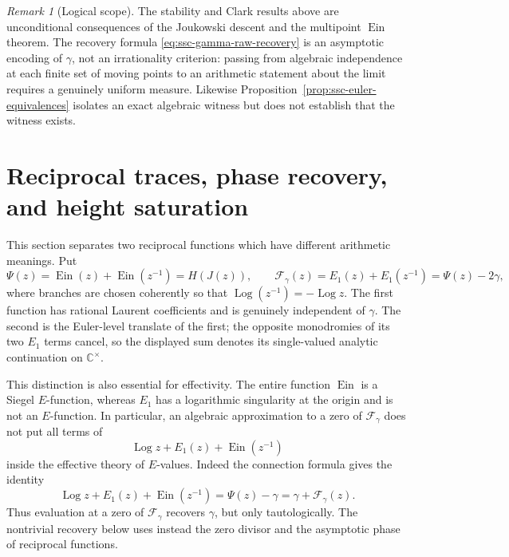 \documentclass[11pt]{article}
\theoremstyle{definition}
\theoremstyle{remark}
\newtheorem{remark}[theorem]{Remark}
\newcommand{\C}{\mathbb C}
\newcommand{\Ein}{\operatorname{Ein}}
\newcommand{\Log}{\operatorname{Log}}
\begin{document}
\begin{remark}[Logical scope]
The stability and Clark results above are unconditional consequences of
the Joukowski descent and the multipoint \(\Ein\) theorem.  The recovery
formula \eqref{eq:ssc-gamma-raw-recovery} is an asymptotic encoding of
\(\gamma\), not an irrationality criterion: passing from algebraic
independence at each finite set of moving points to an arithmetic statement
about the limit requires a genuinely uniform measure.  Likewise
Proposition~\ref{prop:ssc-euler-equivalences} isolates an exact algebraic
witness but does not establish that the witness exists.
\end{remark}

\section{Reciprocal traces, phase recovery, and height saturation}
\label{sec:reciprocal-trace-height}

This section separates two reciprocal functions which have different
arithmetic meanings.  Put
\begin{equation}\label{eq:Psi-and-Fgamma}
 \Psi(z)=\Ein(z)+\Ein(z^{-1})=H(J(z)),
 \qquad
 \mathcal F_\gamma(z)=E_1(z)+E_1(z^{-1})=\Psi(z)-2\gamma,
\end{equation}
where branches are chosen coherently so that
$\Log(z^{-1})=-\Log z$.  The first function has rational Laurent
coefficients and is genuinely independent of $\gamma$.  The second is the
Euler-level translate of the first; the opposite monodromies of its two
$E_1$ terms cancel, so the displayed sum denotes its single-valued analytic
continuation on $\C^\times$.

This distinction is also essential for effectivity.  The entire function
$\Ein$ is a Siegel $E$-function, whereas $E_1$ has a logarithmic
singularity at the origin and is not an $E$-function.  In particular,
an algebraic approximation to a zero of $\mathcal F_\gamma$ does not put all
terms of
\[
 \Log z+E_1(z)+\Ein(z^{-1})
\]
inside the effective theory of $E$-values.  Indeed the connection formula
gives the identity
\begin{equation}\label{eq:tautological-recovery}
 \Log z+E_1(z)+\Ein(z^{-1})
 =\Psi(z)-\gamma=\gamma+\mathcal F_\gamma(z).
\end{equation}
Thus evaluation at a zero of $\mathcal F_\gamma$ recovers $\gamma$, but
only tautologically.  The nontrivial recovery below uses instead the zero
divisor and the asymptotic phase of reciprocal functions.
\end{document}
